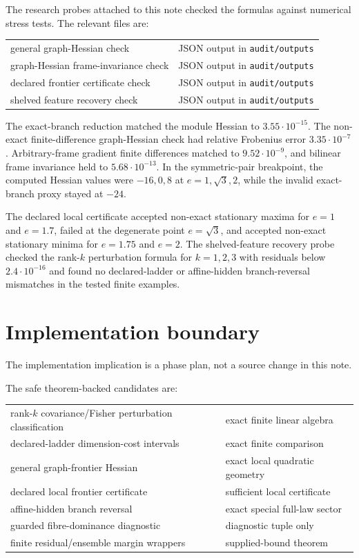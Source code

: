 \documentclass[11pt,a4paper]{article}
\numberwithin{equation}{section}
\theoremstyle{thmcompact}
\theoremstyle{remark}
\begin{document}
The research probes attached to this note checked the formulas against numerical stress tests. The relevant files are:
\begin{center}
\small
\begin{tabular}{p{}p{}}
general graph-Hessian check & JSON output in \texttt{audit/outputs}\\
graph-Hessian frame-invariance check & JSON output in \texttt{audit/outputs}\\
declared frontier certificate check & JSON output in \texttt{audit/outputs}\\
shelved feature recovery check & JSON output in \texttt{audit/outputs}
\end{tabular}
\end{center}
The exact-branch reduction matched the module Hessian to $3.55\cdot10^{-15}$. The non-exact finite-difference graph-Hessian check had relative Frobenius error $3.35\cdot10^{-7}$. Arbitrary-frame gradient finite differences matched to $9.52\cdot10^{-9}$, and bilinear frame invariance held to $5.68\cdot10^{-13}$. In the symmetric-pair breakpoint, the computed Hessian values were $-16,0,8$ at $e=1,\sqrt3,2$, while the invalid exact-branch proxy stayed at $-24$.

The declared local certificate accepted non-exact stationary maxima for $e=1$ and $e=1.7$, failed at the degenerate point $e=\sqrt3$, and accepted non-exact stationary minima for $e=1.75$ and $e=2$. The shelved-feature recovery probe checked the rank-$k$ perturbation formula for $k=1,2,3$ with residuals below $2.4\cdot10^{-16}$ and found no declared-ladder or affine-hidden branch-reversal mismatches in the tested finite examples.

\section{Implementation boundary}

The implementation implication is a phase plan, not a source change in this note.

The safe theorem-backed candidates are:
\begin{center}
\small
\begin{tabular}{p{}p{}}
rank-$k$ covariance/Fisher perturbation classification & exact finite linear algebra\\
declared-ladder dimension-cost intervals & exact finite comparison\\
general graph-frontier Hessian & exact local quadratic geometry\\
declared local frontier certificate & sufficient local certificate\\
affine-hidden branch reversal & exact special full-law sector\\
guarded fibre-dominance diagnostic & diagnostic tuple only\\
finite residual/ensemble margin wrappers & supplied-bound theorem
\end{tabular}
\end{center}
\end{document}
